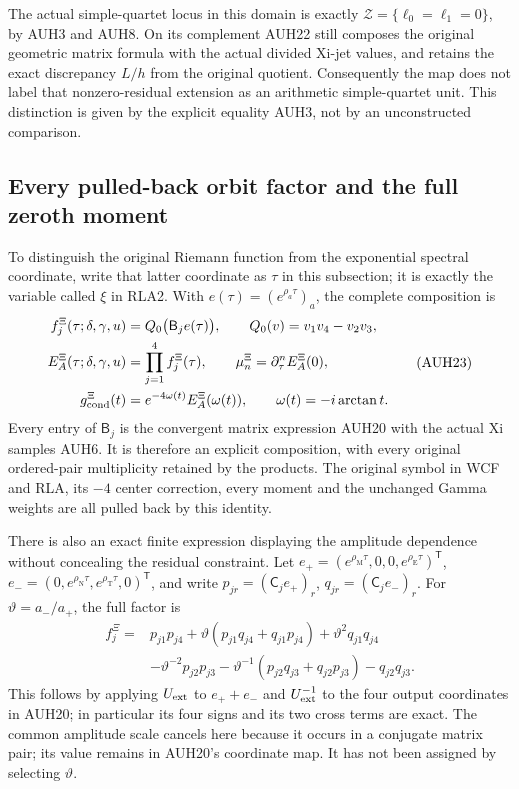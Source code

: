 \documentclass[11pt]{article}
\begin{document}
The actual simple-quartet locus in this domain is exactly
$\mathcal Z=\{\ell_0=\ell_1=0\}$, by AUH3 and AUH8.
On its complement AUH22 still composes the original geometric
matrix formula with the actual divided Xi-jet values, and retains
the exact discrepancy $L/h$ from the original quotient.
Consequently the map does not label that nonzero-residual extension
as an arithmetic simple-quartet unit.  This distinction is given
by the explicit equality AUH3, not by an unconstructed comparison.

\subsection{Every pulled-back orbit factor and the full zeroth moment}

To distinguish the original Riemann function from the exponential
spectral coordinate, write that latter coordinate as $\tau$ in this
subsection; it is exactly the variable called $\xi$ in RLA2.
With $e(\tau)=(e^{\rho_a\tau})_a$, the complete composition is
\[
\begin{aligned}
 f_j^{\Xi}(\tau;\delta,\gamma,u)
 &=Q_0\bigl(\mathsf B_j e(\tau)\bigr),\qquad Q_0(v)=v_1v_4-v_2v_3,\\
 E_A^{\Xi}(\tau;\delta,\gamma,u)&=\prod_{j=1}^4f_j^{\Xi}(\tau),\qquad
 \mu_n^{\Xi}=\partial_\tau^nE_A^{\Xi}(0),\\
 g_{\rm cond}^{\Xi}(t)&=e^{-4\omega(t)}E_A^{\Xi}(\omega(t)),
       \qquad\omega(t)=-i\arctan t.
\end{aligned}\tag{AUH23}
\]
Every entry of $\mathsf B_j$ is the convergent matrix expression
AUH20 with the actual Xi samples AUH6.  It is therefore an explicit
composition, with every original ordered-pair multiplicity retained
by the products.  The original symbol in WCF and RLA, its $-4$
center correction, every moment and the unchanged Gamma weights
are all pulled back by this identity.

There is also an exact finite expression displaying the amplitude
dependence without concealing the residual constraint.
Let $e_+=(e^{\rho_{\mathrm M}\tau},0,0,e^{\rho_{\mathrm E}\tau})^{\mathsf T}$,
$e_-=(0,e^{\rho_{\mathrm N}\tau},e^{\rho_{\mathrm T}\tau},0)^{\mathsf T}$,
and write $p_{jr}=(\mathsf C_je_+)_r$,
$q_{jr}=(\mathsf C_je_-)_r$.
For $\vartheta=a_-/a_+$, the full factor is
\[
\begin{aligned}
 f_j^{\Xi}
 ={}&p_{j1}p_{j4}
 +\vartheta(p_{j1}q_{j4}+q_{j1}p_{j4})
 +\vartheta^2q_{j1}q_{j4}\\
 &-\vartheta^{-2}p_{j2}p_{j3}
 -\vartheta^{-1}(p_{j2}q_{j3}+q_{j2}p_{j3})
 -q_{j2}q_{j3}.
\end{aligned}\tag{AUH24}
\]
This follows by applying $U_{\rm ext}$ to $e_++e_-$ and
$U_{\rm ext}^{-1}$ to the four output coordinates in AUH20;
in particular its four signs and its two cross terms are exact.
The common amplitude scale cancels here because it occurs in a
conjugate matrix pair; its value remains in AUH20's coordinate map.
It has not been assigned by selecting $\vartheta$.
\end{document}
